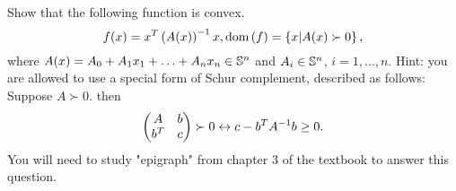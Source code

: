 \documentclass{exam}
\begin{document}
\begin{questions}
    \question Show that the following function is convex.
    $$f(x) = x^T\paren{A(x)}^\inv x, \dom{f} = \cbrac{x | A(x) \succ 0},$$
    where $A(x) = A_0 + A_1x_1 + \hdots + A_nx_n \in\S^n$ and $A_i\in\S^n$, $i = 1, \hdots, n$. Hint: you are allowed to use
    a special form of Schur complement, described as follows: Suppose $A \succ 0$. then
    $$\paren{\begin{matrix}
        A & b \\
        b^T & c
    \end{matrix}} \succ 0 \leftrightarrow c - b^TA^\inv b \geq 0.$$
    You will need to study "epigraph" from chapter 3 of the textbook to answer this question.


\end{questions}
\end{document}
